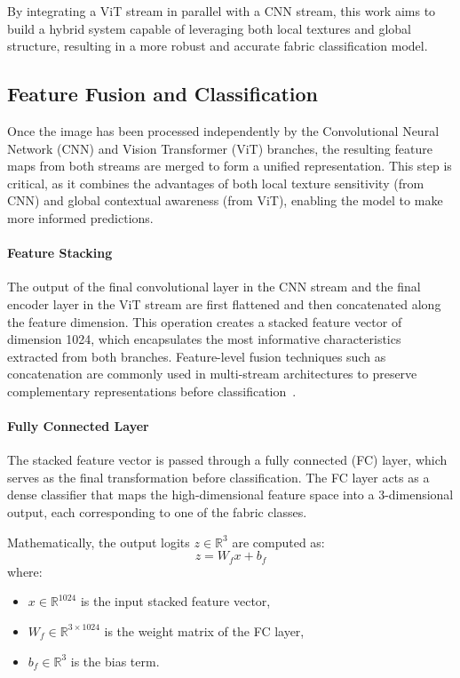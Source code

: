 By integrating a ViT stream in parallel with a CNN stream, this work aims to build a hybrid system capable of leveraging both local textures and global structure, resulting in a more robust and accurate fabric classification model.

\subsection{Feature Fusion and Classification}

Once the image has been processed independently by the Convolutional Neural Network (CNN) and Vision Transformer (ViT) branches, the resulting feature maps from both streams are merged to form a unified representation. This step is critical, as it combines the advantages of both local texture sensitivity (from CNN) and global contextual awareness (from ViT), enabling the model to make more informed predictions.

\paragraph{Feature Stacking}

The output of the final convolutional layer in the CNN stream and the final encoder layer in the ViT stream are first flattened and then concatenated along the feature dimension. This operation creates a stacked feature vector of dimension 1024, which encapsulates the most informative characteristics extracted from both branches. Feature-level fusion techniques such as concatenation are commonly used in multi-stream architectures to preserve complementary representations before classification~\cite{zhong2023textilenet, chitra2023fabric, xu2018multichannel}.

\paragraph{Fully Connected Layer}

The stacked feature vector is passed through a fully connected (FC) layer, which serves as the final transformation before classification. The FC layer acts as a dense classifier that maps the high-dimensional feature space into a 3-dimensional output, each corresponding to one of the fabric classes.

Mathematically, the output logits \( z \in \mathbb{R}^3 \) are computed as:
\[
z = W_f x + b_f
\]
where:
\begin{itemize}[noitemsep,topsep=0pt]
    \item \( x \in \mathbb{R}^{1024} \) is the input stacked feature vector,
    \item \( W_f \in \mathbb{R}^{3 \times 1024} \) is the weight matrix of the FC layer,
    \item \( b_f \in \mathbb{R}^{3} \) is the bias term.
\end{itemize}


